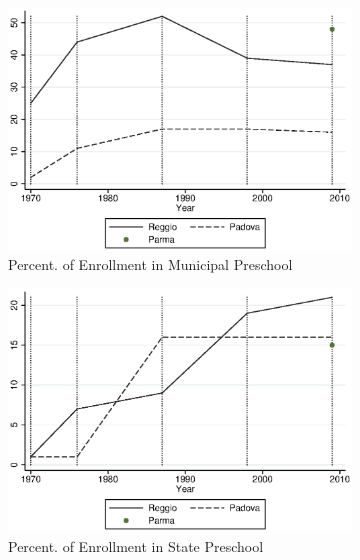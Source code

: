 \begin{figure}[H]
\begin{subfigure}[t]{0.49\textwidth}
          \includegraphics[width=\textwidth]{../../output/image/enroll_per_muni_graph.eps} 
        \caption{Percent. of Enrollment in Municipal Preschool}        
        \end{subfigure}
        \begin{subfigure}[t]{0.49\textwidth}
          \includegraphics[width=\textwidth]{../../output/image/enroll_per_stat_graph.eps}
            \caption{Percent. of Enrollment in State Preschool}       
        \end{subfigure}
      \begin{subfigure}[ht]{0.48\textwidth}

\end{subfigure}
\end{figure}
